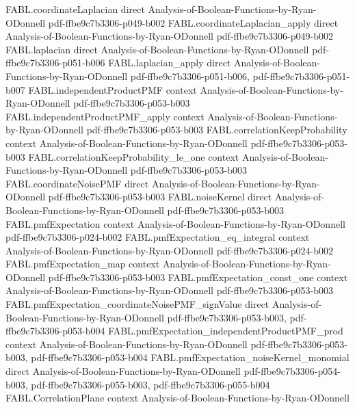 \begin{theorem}
\proofstep
  {FABL.coordinateLaplacian}
  {direct}
  {Analysis-of-Boolean-Functions-by-Ryan-ODonnell}
  {pdf-ffbe9c7b3306-p049-b002}
\proofstep
  {FABL.coordinateLaplacian_apply}
  {direct}
  {Analysis-of-Boolean-Functions-by-Ryan-ODonnell}
  {pdf-ffbe9c7b3306-p049-b002}
\proofstep
  {FABL.laplacian}
  {direct}
  {Analysis-of-Boolean-Functions-by-Ryan-ODonnell}
  {pdf-ffbe9c7b3306-p051-b006}
\proofstep
  {FABL.laplacian_apply}
  {direct}
  {Analysis-of-Boolean-Functions-by-Ryan-ODonnell}
  {pdf-ffbe9c7b3306-p051-b006,
    pdf-ffbe9c7b3306-p051-b007}
\proofstep
  {FABL.independentProductPMF}
  {context}
  {Analysis-of-Boolean-Functions-by-Ryan-ODonnell}
  {pdf-ffbe9c7b3306-p053-b003}
\proofstep
  {FABL.independentProductPMF_apply}
  {context}
  {Analysis-of-Boolean-Functions-by-Ryan-ODonnell}
  {pdf-ffbe9c7b3306-p053-b003}
\proofstep
  {FABL.correlationKeepProbability}
  {context}
  {Analysis-of-Boolean-Functions-by-Ryan-ODonnell}
  {pdf-ffbe9c7b3306-p053-b003}
\proofstep
  {FABL.correlationKeepProbability_le_one}
  {context}
  {Analysis-of-Boolean-Functions-by-Ryan-ODonnell}
  {pdf-ffbe9c7b3306-p053-b003}
\proofstep
  {FABL.coordinateNoisePMF}
  {direct}
  {Analysis-of-Boolean-Functions-by-Ryan-ODonnell}
  {pdf-ffbe9c7b3306-p053-b003}
\proofstep
  {FABL.noiseKernel}
  {direct}
  {Analysis-of-Boolean-Functions-by-Ryan-ODonnell}
  {pdf-ffbe9c7b3306-p053-b003}
\proofstep
  {FABL.pmfExpectation}
  {context}
  {Analysis-of-Boolean-Functions-by-Ryan-ODonnell}
  {pdf-ffbe9c7b3306-p024-b002}
\proofstep
  {FABL.pmfExpectation_eq_integral}
  {context}
  {Analysis-of-Boolean-Functions-by-Ryan-ODonnell}
  {pdf-ffbe9c7b3306-p024-b002}
\proofstep
  {FABL.pmfExpectation_map}
  {context}
  {Analysis-of-Boolean-Functions-by-Ryan-ODonnell}
  {pdf-ffbe9c7b3306-p053-b003}
\proofstep
  {FABL.pmfExpectation_const_one}
  {context}
  {Analysis-of-Boolean-Functions-by-Ryan-ODonnell}
  {pdf-ffbe9c7b3306-p053-b003}
\proofstep
  {FABL.pmfExpectation_coordinateNoisePMF_signValue}
  {direct}
  {Analysis-of-Boolean-Functions-by-Ryan-ODonnell}
  {pdf-ffbe9c7b3306-p053-b003,
    pdf-ffbe9c7b3306-p053-b004}
\proofstep
  {FABL.pmfExpectation_independentProductPMF_prod}
  {context}
  {Analysis-of-Boolean-Functions-by-Ryan-ODonnell}
  {pdf-ffbe9c7b3306-p053-b003,
    pdf-ffbe9c7b3306-p053-b004}
\proofstep
  {FABL.pmfExpectation_noiseKernel_monomial}
  {direct}
  {Analysis-of-Boolean-Functions-by-Ryan-ODonnell}
  {pdf-ffbe9c7b3306-p054-b003,
    pdf-ffbe9c7b3306-p055-b003,
    pdf-ffbe9c7b3306-p055-b004}
\proofstep
  {FABL.CorrelationPlane}
  {context}
  {Analysis-of-Boolean-Functions-by-Ryan-ODonnell}

\end{theorem}
